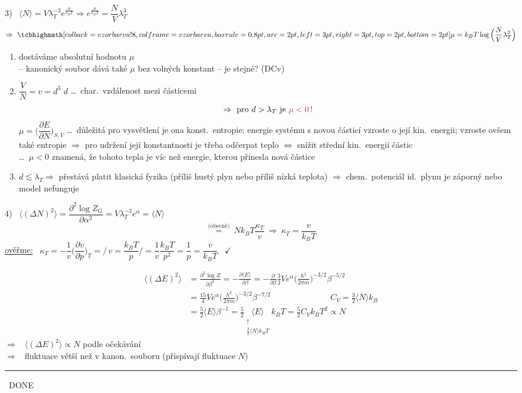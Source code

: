 {\color{NavyBlue}
3) \ $\langle N\rangle = V\lambda_T^{-3}e^{\frac{\mu}{k_BT}} \Rightarrow e^{\frac{\mu}{k_BT}} = \dfrac NV\lambda_T^3$
\[
  \Rightarrow\ \vzorec{\mu = k_BT\log\Big(\frac NV\lambda_T^3\Big)}
\]
\begin{enumerate}[label=\alph*)]
  \item dostáváme absolutní hodnotu $\mu$ \\
        -- kanonický soubor dává také $\mu$ bez volných konstant -- je stejné? (DCv)
  \item $\dfrac VN = v = d^3$ \quad $d$ \dots\ char.\ vzdálenost mezi částicemi
        \[ \Rightarrow\ \text{pro } d > \lambda_T \text{ je } \text{\pozor{$\mu < 0\,!$}} \]
        $\mu = \Big(\dfrac{\partial E}{\partial N}\Big)_{S,V}$ \dots\ důležitá pro vysvětlení je ona konst.\ entropie: energie systému s novou
        částicí vzroste o její kin.\ energii; vzroste ovšem také entropie $\Rightarrow$ pro udržení její konstantnosti je třeba odčerpat
        teplo $\Leftrightarrow$ snížit střední kin.\ energii částic \\
        \hspace*{2cm}\dots\ $\mu < 0$ znamená, že tohoto tepla je víc než energie, kterou přinesla nová částice
  \item $d \lesssim \lambda_T \Rightarrow$ přestává platit klasická fyzika (příliš hustý plyn nebo příliš nízká teplota)
        $\Rightarrow$ chem.\ potenciál id.\ plynu je záporný nebo model nefunguje
\end{enumerate}

4) \ $\langle(\Delta N)^2\rangle = \dfrac{\partial^2\log Z_G}{\partial\alpha^2} = V\lambda_T^{-3}e^\alpha = \langle N\rangle$
\[
  \overset{\text{(obecně)}}{=}\ Nk_BT\frac{\kappa_T}{v} \ \Rightarrow\ \kappa_T = \frac{v}{k_BT}
\]
\underline{ověřme:} \ $\kappa_T = -\dfrac1v\Big(\dfrac{\partial v}{\partial p}\Big)_T = \Big/\,v = \dfrac{k_BT}{p}\Big/ = \dfrac1v\dfrac{k_BT}{p^2} = \dfrac1p = \dfrac{v}{k_BT}$ \ $\checkmark$
}

{\color{NavyBlue}
\begin{align*}
  \langle(\Delta E)^2\rangle &= \frac{\partial^2\log Z}{\partial\beta^2} = -\frac{\partial\langle E\rangle}{\partial\beta}
   = -\frac{\partial}{\partial\beta}\frac32Ve^\alpha\Big(\frac{h^2}{2\pi m}\Big)^{-3/2}\beta^{-5/2} \\
  &= \frac{15}{4}Ve^\alpha\Big(\frac{h^2}{2\pi m}\Big)^{-3/2}\beta^{-7/2}
   \hspace{3cm} C_V = \tfrac32\langle N\rangle k_B \\
  &= \frac52\langle E\rangle\beta^{-1} = \frac52\underset{\substack{\uparrow\\ \frac32\langle N\rangle k_BT}}{\langle E\rangle}k_BT
   = \frac52C_Vk_BT^2 \propto N
\end{align*}
$\Rightarrow$ \ $\langle(\Delta E)^2\rangle \propto N$ podle očekávání \\
$\Rightarrow$ \ fluktuace větší než v kanon.\ souboru (přispívají fluktuace $N$)

\noindent\rule{0.85\linewidth}{0.4pt} \ DONE
}

